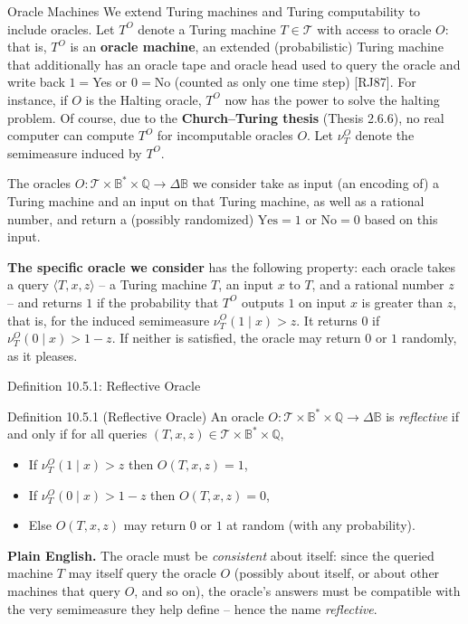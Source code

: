 \documentclass[aspectratio=169,10pt]{beamer}
\newcommand{\B}{\mathbb{B}}
\newcommand{\Tc}{\mathcal{T}}
\begin{document}
\begin{frame}{Oracle Machines}
  We extend Turing machines and Turing computability to include oracles.
  Let $T^O$ denote a Turing machine $T\in\Tc$ with access to oracle $O$:
  that is, $T^O$ is an \textbf{oracle machine}, an extended (probabilistic)
  Turing machine that additionally has an oracle tape and oracle head used
  to query the oracle and write back $1=$Yes or $0=$No (counted as only
  one time step) {\footnotesize[RJ87]}. For instance, if $O$ is the
  Halting oracle, $T^O$ now has the power to solve the halting problem. Of
  course, due to the \textbf{Church--Turing thesis} (Thesis 2.6.6), no
  real computer can compute $T^O$ for incomputable oracles $O$. Let
  $\nu_T^O$ denote the semimeasure induced by $T^O$.

  \vspace{0.3em}
  The oracles $O:\Tc\times\B^*\times\mathbb{Q}\to\Delta\B$ we consider
  take as input (an encoding of) a Turing machine and an input on that
  Turing machine, as well as a rational number, and return a (possibly
  randomized) $\text{Yes}=1$ or $\text{No}=0$ based on this input.

  \vspace{0.3em}
  \textbf{The specific oracle we consider} has the following property:
  each oracle takes a query $\langle T,x,z\rangle$ -- a Turing machine $T$,
  an input $x$ to $T$, and a rational number $z$ -- and returns $1$ if the
  probability that $T^O$ outputs $1$ on input $x$ is greater than $z$,
  that is, for the induced semimeasure $\nu_T^O(1\mid x)>z$. It returns
  $0$ if $\nu_T^O(0\mid x)>1-z$. If neither is satisfied, the oracle may
  return $0$ or $1$ randomly, as it pleases.
\end{frame}

\begin{frame}{Definition 10.5.1: Reflective Oracle}
  \begin{block}{Definition 10.5.1 (Reflective Oracle)}
    An oracle $O:\Tc\times\B^*\times\mathbb{Q}\to\Delta\B$ is
    \emph{reflective} if and only if for all queries
    $(T,x,z)\in\Tc\times\B^*\times\mathbb{Q}$,
    \begin{itemize}
      \item If $\nu_T^O(1\mid x) > z$ then $O(T,x,z)=1$,
      \item If $\nu_T^O(0\mid x) > 1-z$ then $O(T,x,z)=0$,
      \item Else $O(T,x,z)$ may return $0$ or $1$ at random (with any
        probability).
    \end{itemize}
  \end{block}
  \textbf{Plain English.} The oracle must be \emph{consistent} about
  itself: since the queried machine $T$ may itself query the oracle $O$
  (possibly about itself, or about other machines that query $O$, and so
  on), the oracle's answers must be compatible with the very semimeasure
  they help define -- hence the name \emph{reflective}.
\end{frame}
\end{document}
